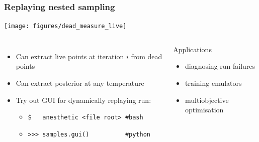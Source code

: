 \documentclass[aspectratio=169]{beamer}
\begin{document}
\begin{frame}
    \frametitle{Replaying nested sampling}
    \texttt{[image: figures/dead\_measure\_live]}
    \begin{columns}
        \begin{itemize}
            \item Can extract live points at iteration $i$ from dead points
            \item Can extract posterior at any temperature
            \item Try out GUI for dynamically replaying run:
                \begin{itemize}
                    \item \texttt{\$\ \ \  anesthetic <file root> \#bash}
                    \item \texttt{>>> samples.gui()\ \ \ \ \ \ \ \ \ \ \#python}
                \end{itemize}
        \end{itemize}
        \begin{block}{Applications}
        \begin{itemize}
            \item diagnosing run failures
            \item training emulators
            \item multiobjective optimisation
        \end{itemize}
        \end{block}
    \end{columns}
\end{frame}
\end{document}
